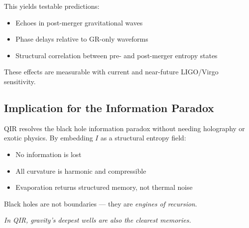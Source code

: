 \documentclass[11pt]{article}
\begin{document}
This yields testable predictions:
\begin{itemize}
  \item Echoes in post-merger gravitational waves
  \item Phase delays relative to GR-only waveforms
  \item Structural correlation between pre- and post-merger entropy states
\end{itemize}

These effects are measurable with current and near-future LIGO/Virgo sensitivity.

\subsection*{Implication for the Information Paradox}

QIR resolves the black hole information paradox without needing holography or exotic physics. By embedding \( I \) as a structural entropy field:
\begin{itemize}
  \item No information is lost
  \item All curvature is harmonic and compressible
  \item Evaporation returns structured memory, not thermal noise
\end{itemize}

Black holes are not boundaries — they are \textit{engines of recursion}.

\textit{In QIR, gravity’s deepest wells are also the clearest memories.}
\end{document}
